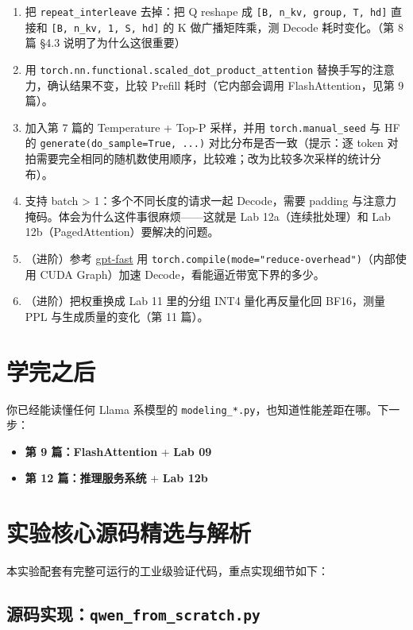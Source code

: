 \begin{enumerate}
  \item 把 \texttt{repeat\_interleave} 去掉：把 Q reshape 成 \texttt{[B, n\_kv, group, T, hd]} 直接和 \texttt{[B, n\_kv, 1, S, hd]} 的 K 做广播矩阵乘，测 Decode 耗时变化。（第 8 篇 §4.3 说明了为什么这很重要）
  \item 用 \texttt{torch.nn.functional.scaled\_dot\_product\_attention} 替换手写的注意力，确认结果不变，比较 Prefill 耗时（它内部会调用 FlashAttention，见第 9 篇）。
  \item 加入第 7 篇的 Temperature + Top-P 采样，并用 \texttt{torch.manual\_seed} 与 HF 的 \texttt{generate(do\_sample=True, ...)} 对比分布是否一致（提示：逐 token 对拍需要完全相同的随机数使用顺序，比较难；改为比较多次采样的统计分布）。
  \item 支持 batch > 1：多个不同长度的请求一起 Decode，需要 padding 与注意力掩码。体会为什么这件事很麻烦——这就是 Lab 12a（连续批处理）和 Lab 12b（PagedAttention）要解决的问题。
  \item （进阶）参考 \href{https://github.com/pytorch-labs/gpt-fast}{gpt-fast} 用 \texttt{torch.compile(mode="reduce-overhead")}（内部使用 CUDA Graph）加速 Decode，看能逼近带宽下界的多少。
  \item （进阶）把权重换成 Lab 11 里的分组 INT4 量化再反量化回 BF16，测量 PPL 与生成质量的变化（第 11 篇）。
\end{enumerate}

\section{学完之后}

你已经能读懂任何 Llama 系模型的 \texttt{modeling\_*.py}，也知道性能差距在哪。下一步：
\begin{itemize}
  \item {}\textbf{第 9 篇：FlashAttention} + \textbf{Lab 09}
  \item {}\textbf{第 12 篇：推理服务系统} + \textbf{Lab 12b}
\end{itemize}



\section{实验核心源码精选与解析}

本实验配套有完整可运行的工业级验证代码，重点实现细节如下：


\subsection{源码实现：\texttt{qwen\_from\_scratch.py}}



